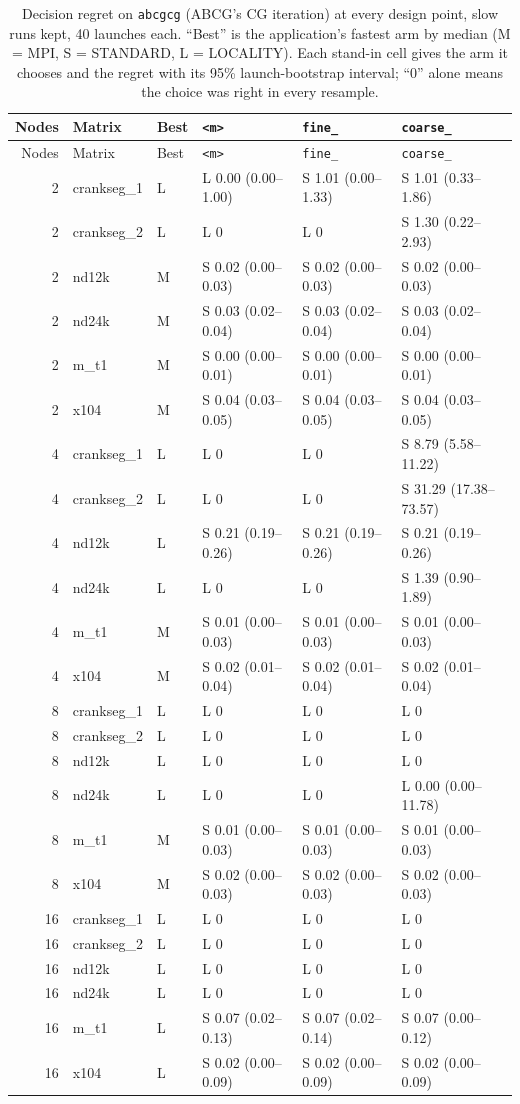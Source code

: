 \documentclass[11pt]{article}
\newcommand{\kM}{\texttt{<m>}}
\newcommand{\kF}{\texttt{fine\_}}
\newcommand{\kC}{\texttt{coarse\_}}
\newcommand{\cg}{\texttt{abcgcg}}
\begin{document}
\small
\begin{longtable}{@{}rllp{2.9cm}p{2.9cm}p{2.9cm}@{}}
\caption{Decision regret on \cg{} (ABCG's CG iteration) at every design point, slow runs kept, 40 launches
each. ``Best'' is the application's fastest arm by median (M = MPI, S = STANDARD, L =
LOCALITY). Each stand-in cell gives the arm it chooses and the regret with its 95\%
launch-bootstrap interval; ``0'' alone means the choice was right in every resample.}
\label{tab:app:h17abcgcg}\\
\toprule
Nodes & Matrix & Best & \kM & \kF & \kC \\
\midrule
\endfirsthead
\toprule
Nodes & Matrix & Best & \kM & \kF & \kC \\
\midrule
\endhead
2 & crankseg\_1 & L & L 0.00 (0.00--1.00) & S 1.01 (0.00--1.33) & S 1.01 (0.33--1.86) \\
2 & crankseg\_2 & L & L 0 & L 0 & S 1.30 (0.22--2.93) \\
2 & nd12k & M & S 0.02 (0.00--0.03) & S 0.02 (0.00--0.03) & S 0.02 (0.00--0.03) \\
2 & nd24k & M & S 0.03 (0.02--0.04) & S 0.03 (0.02--0.04) & S 0.03 (0.02--0.04) \\
2 & m\_t1 & M & S 0.00 (0.00--0.01) & S 0.00 (0.00--0.01) & S 0.00 (0.00--0.01) \\
2 & x104 & M & S 0.04 (0.03--0.05) & S 0.04 (0.03--0.05) & S 0.04 (0.03--0.05) \\
\midrule
4 & crankseg\_1 & L & L 0 & L 0 & S 8.79 (5.58--11.22) \\
4 & crankseg\_2 & L & L 0 & L 0 & S 31.29 (17.38--73.57) \\
4 & nd12k & L & S 0.21 (0.19--0.26) & S 0.21 (0.19--0.26) & S 0.21 (0.19--0.26) \\
4 & nd24k & L & L 0 & L 0 & S 1.39 (0.90--1.89) \\
4 & m\_t1 & M & S 0.01 (0.00--0.03) & S 0.01 (0.00--0.03) & S 0.01 (0.00--0.03) \\
4 & x104 & M & S 0.02 (0.01--0.04) & S 0.02 (0.01--0.04) & S 0.02 (0.01--0.04) \\
\midrule
8 & crankseg\_1 & L & L 0 & L 0 & L 0 \\
8 & crankseg\_2 & L & L 0 & L 0 & L 0 \\
8 & nd12k & L & L 0 & L 0 & L 0 \\
8 & nd24k & L & L 0 & L 0 & L 0.00 (0.00--11.78) \\
8 & m\_t1 & M & S 0.01 (0.00--0.03) & S 0.01 (0.00--0.03) & S 0.01 (0.00--0.03) \\
8 & x104 & M & S 0.02 (0.00--0.03) & S 0.02 (0.00--0.03) & S 0.02 (0.00--0.03) \\
\midrule
16 & crankseg\_1 & L & L 0 & L 0 & L 0 \\
16 & crankseg\_2 & L & L 0 & L 0 & L 0 \\
16 & nd12k & L & L 0 & L 0 & L 0 \\
16 & nd24k & L & L 0 & L 0 & L 0 \\
16 & m\_t1 & L & S 0.07 (0.02--0.13) & S 0.07 (0.02--0.14) & S 0.07 (0.00--0.12) \\
16 & x104 & L & S 0.02 (0.00--0.09) & S 0.02 (0.00--0.09) & S 0.02 (0.00--0.09) \\


\end{longtable}
\end{document}
